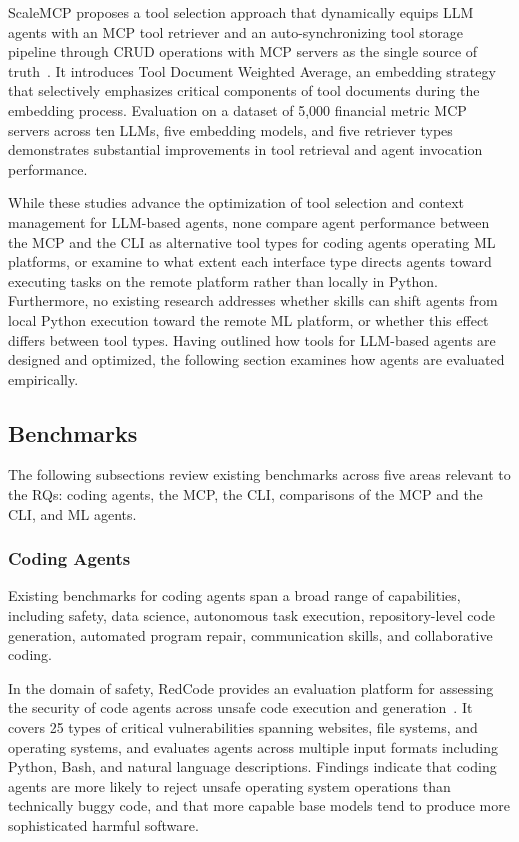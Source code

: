 \documentclass[
english,                 %
bibtex,                  %
includeExtraAbstracts, %
]{kththesis}
\numberwithin{listing}{chapter}
\begin{document}
ScaleMCP proposes a tool selection approach that dynamically equips \gls{LLM} agents with an \gls{MCP} tool retriever and an auto-synchronizing tool storage pipeline through CRUD operations with \gls{MCP} servers as the single source of truth~\cite{v_scaling_2025}. It introduces Tool Document Weighted Average, an embedding strategy that selectively emphasizes critical components of tool documents during the embedding process. Evaluation on a dataset of 5,000 financial metric \gls{MCP} servers across ten \glspl{LLM}, five embedding models, and five retriever types demonstrates substantial improvements in tool retrieval and agent invocation performance.

While these studies advance the optimization of tool selection and context management for \gls{LLM}-based agents, none compare agent performance between the \gls{MCP} and the \gls{CLI} as alternative tool types for coding agents operating \gls{ML} platforms, or examine to what extent each interface type directs agents toward executing tasks on the remote platform rather than locally in Python. Furthermore, no existing research addresses whether skills can shift agents from local Python execution toward the remote \gls{ML} platform, or whether this effect differs between tool types. Having outlined how tools for \gls{LLM}-based agents are designed and optimized, the following section examines how agents are evaluated empirically.

\subsection{Benchmarks}

The following subsections review existing benchmarks across five areas relevant to the \glspl{RQ}: coding agents, the \gls{MCP}, the \gls{CLI}, comparisons of the \gls{MCP} and the \gls{CLI}, and \gls{ML} agents.

\subsubsection{Coding Agents}

Existing benchmarks for coding agents span a broad range of capabilities, including safety, data science, autonomous task execution, repository-level code generation, automated program repair, communication skills, and collaborative coding.

In the domain of safety, RedCode provides an evaluation platform for assessing the security of code agents across unsafe code execution and generation~\cite{guo_redcode_2024}. It covers 25 types of critical vulnerabilities spanning websites, file systems, and operating systems, and evaluates agents across multiple input formats including Python, Bash, and natural language descriptions. Findings indicate that coding agents are more likely to reject unsafe operating system operations than technically buggy code, and that more capable base models tend to produce more sophisticated harmful software.
\end{document}
